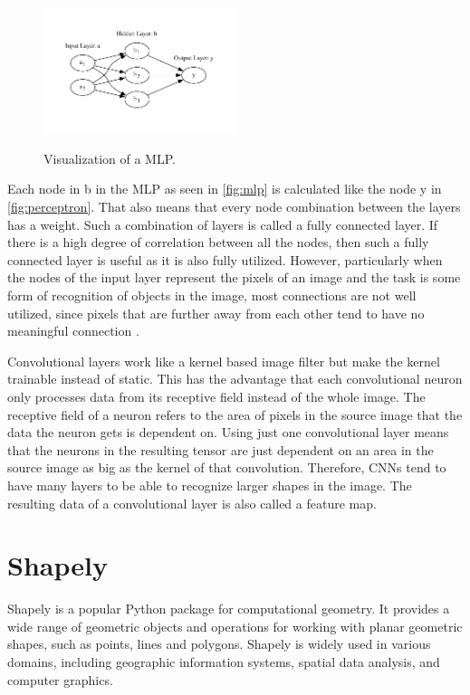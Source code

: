 \documentclass[10pt]{book}
\newcommand{\figureref}[1]{\autoref{#1}}
\begin{document}
\begin{figure}
  \caption{Visualization of a \ac{MLP}.}
  \includegraphics[width=0.5\textwidth]{graph/mlp}
  \label{fig:mlp} 
\end{figure}

Each node in b in the \ac{MLP} as seen in \figureref{fig:mlp} is calculated like the node y in \figureref{fig:perceptron}. That also means that every node combination between the layers has a weight. Such a combination of layers is called a fully connected layer. If there is a high degree of correlation between all the nodes, then such a fully connected layer is useful as it is also fully utilized. However, particularly when the nodes of the input layer represent the pixels of an image and the task is some form of recognition of objects in the image, most connections are not well utilized, since pixels that are further away from each other tend to have no meaningful connection \cite{aghdam2017guide}.

Convolutional layers work like a kernel based image filter but make the kernel trainable instead of static. This has the advantage that each convolutional neuron only processes data from its receptive field instead of the whole image. The receptive field of a neuron refers to the area of pixels in the source image that the data the neuron gets is dependent on. Using just one convolutional layer means that the neurons in the resulting tensor are just dependent on an area in the source image as big as the kernel of that convolution. Therefore, \acp{CNN} tend to have many layers to be able to recognize larger shapes in the image. The resulting data of a convolutional layer is also called a feature map. 

\section{Shapely} %

Shapely is a popular Python package for computational geometry. It provides a wide range of geometric objects and operations for working with planar geometric shapes, such as points, lines and polygons. Shapely is widely used in various domains, including geographic information systems, spatial data analysis, and computer graphics.
\end{document}
